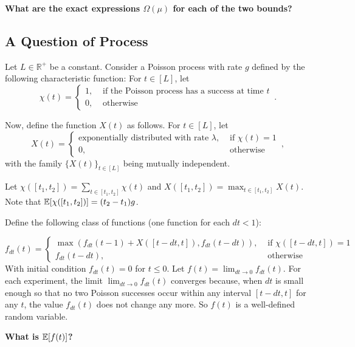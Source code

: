 \textbf{What are the exact expressions $\Omega(\mu)$ for each of the two bounds?}

\subsection{A Question of Process}

Let $L \in \mathbb{R}^+$ be a constant. Consider a Poisson process with rate $g$ defined by the following characteristic function: For $t \in [L]$, let
\[
  \chi(t) = \begin{cases}
    1, & \text{ if the Poisson process has a success at time } t\\
    0, & \text{ otherwise }
  \end{cases}\,.
\]

Now, define the function $X(t)$ as follows. For $t \in [L]$, let
\[
  X(t) = \begin{cases}
    \text{exponentially distributed with rate } \lambda, & \text{ if } \chi(t) = 1\\
    0, & \text{ otherwise }
  \end{cases}\,,
\] with the family $\{ X(t) \}_{t \in [L]}$ being mutually independent.

Let $\chi([t_1, t_2]) = \sum_{t \in [t_1, t_2]} \chi(t)$ and $X([t_1, t_2]) = \max_{t \in [t_1, t_2]} X(t)$.
Note that $\mathop{{}\mathbb{E}}[\chi([t_1, t_2])] = (t_2 - t_1)g$.

Define the following class of functions (one function for each $dt < 1$):

\[
  f_{dt}(t) = \begin{cases}
    \max(f_{dt}(t - 1) + X([t - dt, t]), f_{dt}(t - dt)), & \text{ if } \chi([t - dt, t]) = 1\\
    f_{dt}(t - dt), & \text{ otherwise }
  \end{cases}
\]
With initial condition $f_{dt}(t) = 0$ for $t \leq 0$.
Let $f(t) = \lim_{dt \to 0} f_{dt}(t)$. For each experiment, the limit $\lim_{dt \to 0} f_{dt}(t)$ converges because, when $dt$ is small enough so that no two Poisson successes occur within any interval $[t - dt, t]$ for any $t$, the value $f_{dt}(t)$ does not change any more. So $f(t)$ is a well-defined random variable.

\textbf{What is $\mathop{{}\mathbb{E}}[f(t)]$?}

